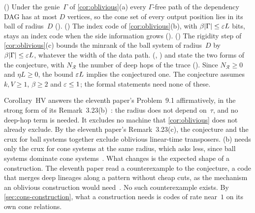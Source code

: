 \begin{outline}
() Under the genie~$\Gamma$ of \cref{cor:oblivious}(a) every $\Gamma$-free path of the
dependency DAG has at most $D$ vertices, so the cone set of every output position lies in its ball of radius~$D$
(). () The index code of \cref{cor:oblivious}(b), with
$\beta\lvert \Gamma \rvert\le\varepsilon L$ bits, stays an index code when the side information grows ().
() The rigidity step of \cref{cor:oblivious}(c) bounds the minrank of the ball system of radius~$D$ by
$\beta\lvert \Gamma \rvert\le\varepsilon L$, whatever the width of the data path. (, )  and
 state the two forms of the conjecture, with $N_{\mathcal R}$ the number of deep hops of the trace
(). Since $N_{\mathcal R}\ge0$ and $\eta L\ge0$, the bound $\varepsilon L$ implies the conjectured one. The
conjecture assumes $k,V\ge1$, $\beta\ge2$ and $\varepsilon\le1$; the formal statements need none of these.
\end{outline}

Corollary~HV answers the eleventh paper's Problem~9.1 affirmatively, in the strong form of its
Remark~3.23(b)~\cite{MergeDepth2026}: the radius does not depend on~$\tau$, and no deep-hop term is needed. It excludes no
machine that \cref{cor:oblivious} does not already exclude. By the eleventh paper's Remark~3.23(c), the conjecture and the crux
for ball systems together exclude oblivious linear-time transposers. (b) needs only the crux for cone
systems at the same radius, which asks less, since ball systems dominate cone systems~\cite[Remark~7.6(a)]{EighthPaper2026}.
What changes is the expected shape of a construction. The eleventh paper read a counterexample to the conjecture, a code that
merges deep lineages along a pattern without cheap cuts, as the mechanism an oblivious construction would
need~\cite[Remark~3.23(d)]{MergeDepth2026}. No such counterexample exists. By \cref{sec:cons-construction}, what a construction
needs is codes of rate near~$1$ on its own cone relations.

